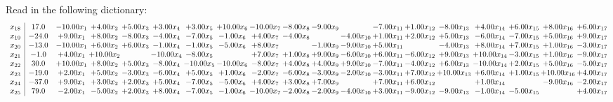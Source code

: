 \documentclass[9pt]{article}
\begin{document}
Read in the following dictionary:
\[\begin{array}{c| c c@{\hskip 2pt} c@{\hskip 2pt} c@{\hskip 2pt} c@{\hskip 2pt} c@{\hskip 2pt} c@{\hskip 2pt} c@{\hskip 2pt} c@{\hskip 2pt} c@{\hskip 2pt} c@{\hskip 2pt} c@{\hskip 2pt} c@{\hskip 2pt} c@{\hskip 2pt} c@{\hskip 2pt} c@{\hskip 2pt} c@{\hskip 2pt} c@{\hskip 2pt} }
 x_{18}   &  17.0 & -10.00 x_{1} & +  4.00 x_{2} & +  5.00 x_{3} & +  3.00 x_{4} & +  3.00 x_{5} & + 10.00 x_{6} & -10.00 x_{7} & -8.00 x_{8} & -9.00 x_{9} &   & -7.00 x_{11} & +  1.00 x_{12} & -8.00 x_{13} & +  4.00 x_{14} & +  6.00 x_{15} & +  8.00 x_{16} & +  6.00 x_{17}\\
 x_{19}   &  -24.0 & +  9.00 x_{1} & +  8.00 x_{2} & -8.00 x_{3} & -4.00 x_{4} & -7.00 x_{5} & -1.00 x_{6} & +  4.00 x_{7} & -4.00 x_{8} &   & -4.00 x_{10} & +  1.00 x_{11} & +  2.00 x_{12} & +  5.00 x_{13} & -6.00 x_{14} & -7.00 x_{15} & +  5.00 x_{16} & +  9.00 x_{17}\\
 x_{20}   &  -13.0 & -10.00 x_{1} & +  6.00 x_{2} & +  6.00 x_{3} & -1.00 x_{4} & -1.00 x_{5} & -5.00 x_{6} & +  8.00 x_{7} &   & -1.00 x_{9} & -9.00 x_{10} & +  5.00 x_{11} &   & -4.00 x_{13} & +  8.00 x_{14} & +  7.00 x_{15} & +  1.00 x_{16} & -3.00 x_{17}\\
 x_{21}   &  -1.0 & +  4.00 x_{1} & + 10.00 x_{2} &   & -10.00 x_{4} & -8.00 x_{5} &   & +  7.00 x_{7} & +  1.00 x_{8} & +  9.00 x_{9} & -6.00 x_{10} & +  6.00 x_{11} & -6.00 x_{12} & +  9.00 x_{13} & + 10.00 x_{14} & -3.00 x_{15} & +  1.00 x_{16} & -9.00 x_{17}\\
 x_{22}   &  30.0 & + 10.00 x_{1} & +  8.00 x_{2} & +  5.00 x_{3} & -8.00 x_{4} & -10.00 x_{5} & -10.00 x_{6} & -8.00 x_{7} & +  4.00 x_{8} & +  4.00 x_{9} & +  9.00 x_{10} & -7.00 x_{11} & -4.00 x_{12} & +  6.00 x_{13} & -10.00 x_{14} & +  2.00 x_{15} & +  5.00 x_{16} & -5.00 x_{17}\\
 x_{23}   &  -19.0 & +  2.00 x_{1} & +  5.00 x_{2} & -3.00 x_{3} & -6.00 x_{4} & +  5.00 x_{5} & +  1.00 x_{6} & -2.00 x_{7} & -6.00 x_{8} & -3.00 x_{9} & -2.00 x_{10} & -3.00 x_{11} & +  7.00 x_{12} & + 10.00 x_{13} & +  6.00 x_{14} & +  1.00 x_{15} & + 10.00 x_{16} & +  4.00 x_{17}\\
 x_{24}   &  -37.0 & +  9.00 x_{1} & +  3.00 x_{2} & +  2.00 x_{3} & +  5.00 x_{4} & -7.00 x_{5} & -5.00 x_{6} & +  4.00 x_{7} & +  3.00 x_{8} & +  7.00 x_{9} &   & +  7.00 x_{11} & +  6.00 x_{12} &   & +  1.00 x_{14} &   & -9.00 x_{16} & -2.00 x_{17}\\
 x_{25}   &  79.0 & -2.00 x_{1} & -5.00 x_{2} & +  2.00 x_{3} & +  8.00 x_{4} & -7.00 x_{5} & -1.00 x_{6} & -10.00 x_{7} & -2.00 x_{8} & -2.00 x_{9} & -4.00 x_{10} & +  3.00 x_{11} & -9.00 x_{12} & -9.00 x_{13} & -1.00 x_{14} & -5.00 x_{15} &   & +  4.00 x_{17}\\

\end{array}\]
\end{document}
